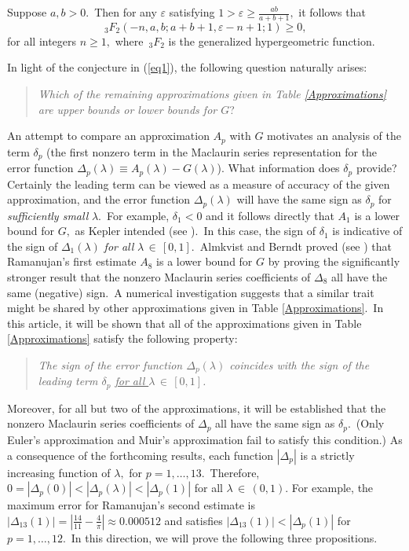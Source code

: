 \documentclass[final,oneeqnum]{siamltex}
\begin{document}
\begin{theorem}
\label{thm1}%
Suppose $a,b>0$.\ Then for any
$\varepsilon $ satisfying $1>\varepsilon \geq\frac{ab}{a+b+1},$ it
follows that
\[
\,_{3}F_{2}\left(-n,a,b;a+b+1,\varepsilon -n +1;1\right)\geq 0, 
\] 
for all
integers $n
\geq 1,$ where $\,_{3}F_{2}$ is the generalized hypergeometric function.\end{theorem}

In light of the conjecture in (\ref{eq1}), the following
question naturally arises:
\begin{quote} {\em  Which  of the remaining  approximations given in Table {\rm\ref{Approximations}}
are  upper bounds or  lower bounds  for $G$}?
\end{quote}

 \noindent An attempt to compare an approximation $A_{p}$ with $G$
 motivates  an  analysis of  the term $\delta_{p}$  (the
first nonzero term in the Maclaurin series representation for the error
function
$\Delta_{p}(\lambda)\equiv A_{p}(\lambda)-G(\lambda)$).
 What information does $\delta_{p}$
 provide? Certainly the leading term can be viewed as a measure of
 accuracy of the given approximation, and the error
function $\Delta_{p}(\lambda)$  will have the same sign as
 $\delta_{p}$
 for {\em sufficiently small} $\lambda$.\ For example, $\delta_{1} <0$ and
  it follows directly that $A_{1}$ is   a lower bound for
 $G,$ as  Kepler intended  (see \cite[p. 599]{AB}).\ In this case,
 the sign of
$\delta_{1}$ is indicative of the sign of  $\Delta_{1}(\lambda)$
{\em for all}  $\lambda \, \in \,[0,1]$.\ Almkvist and
Berndt  proved (see \cite[p. 603]{AB}) that Ramanujan's first
estimate $A_{8}$ is a lower bound for $G$ by proving the
significantly
 stronger result that  the nonzero Maclaurin series coefficients of
 $\Delta_{8}$ all have the same (negative) sign.\ A
numerical investigation suggests that a similar  trait might be
shared by other   approximations given in Table \ref{Approximations}.\  In this
article, it will be shown that all of the approximations  given
in Table \ref{Approximations} satisfy the following property:
\begin{quote} {\em The sign of the error function $\Delta_{p}(\lambda)$
coincides with the sign of the leading term
$\delta_{p}$ \underline{for all  $\lambda\, \in \,[0,1]$}.}
\end{quote} Moreover,  for all but two of the approximations, it will
be established
 that the nonzero Maclaurin series coefficients of $\Delta_{p}$ all have the
 same  sign as $\delta_{p}$.\ (Only  Euler's approximation and Muir's
 approximation fail to satisfy this condition.)
 As a consequence of the forthcoming results,
 each  function
$|\Delta_{p}|$ is  a strictly increasing function of
 $\lambda,$ for $p=1,\ldots,13$.\ Therefore,
$0=|\Delta_{p}(0)| < |\Delta_{p}(\lambda)|< |\Delta_{p}(1)|$  for
all $\lambda \, \in \,(0,1)$.
 For example, the maximum error for Ramanujan's second  estimate
 is $|\Delta_{13}(1)| = |\frac{14}{11} - \frac{4}{\pi}|
\approx 0.000512 $ and satisfies
 $|\Delta_{13}(1)|< |\Delta_{p}(1)|$
 for $p=1,\ldots,12$.\  In this direction, we will prove the following
 three propositions.
\end{document}
